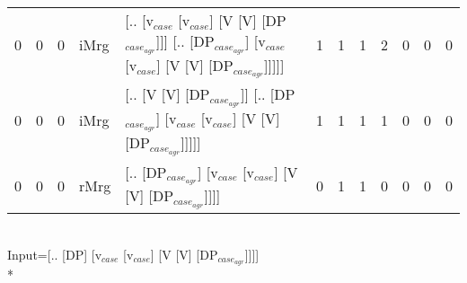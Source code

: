 \begin{tabularx}{\linewidth}{rrrlXrrrrrrr}
   0 &       0 &   0 & iMrg & [.. [v$_{case}$ [v$_{case}$] [V [V] [DP$_{case_{agr}}$]]] [.. [DP$_{case_{agr}}$] [v$_{case}$ [v$_{case}$] [V [V] [DP$_{case_{agr}}$]]]]] &            1 &             1 &             1 &                  2 &              0 &                0 &             0 \\
   0 &       0 &   0 & iMrg & [.. [V [V] [DP$_{case_{agr}}$]] [.. [DP$_{case_{agr}}$] [v$_{case}$ [v$_{case}$] [V [V] [DP$_{case_{agr}}$]]]]]                   &            1 &             1 &             1 &                  1 &              0 &                0 &             0 \\
   0 &       0 &   0 & rMrg & [.. [DP$_{case_{agr}}$] [v$_{case}$ [v$_{case}$] [V [V] [DP$_{case_{agr}}$]]]]                                              &            0 &             1 &             1 &                  0 &              0 &                0 &             0 \\
\hline
\end{tabularx}\endgroup\\
\begingroup\scriptsize Input=[.. [DP] [v$_{case}$ [v$_{case}$] [V [V] [DP$_{case_{agr}}$]]]]\\*

